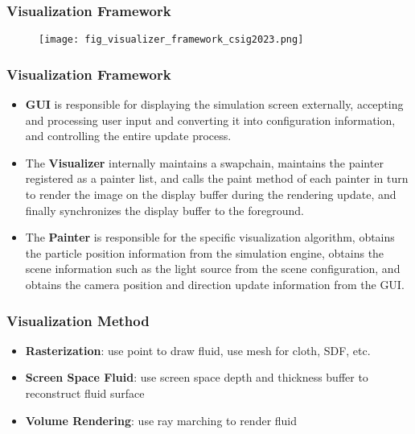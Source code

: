 \begin{frame}
    \frametitle{Visualization Framework}
    \begin{figure}[H]
        \centering
        \texttt{[image: fig\_visualizer\_framework\_csig2023.png]}
    \end{figure}
\end{frame}

\begin{frame}
    \frametitle{Visualization Framework}
    \begin{itemize}
        \item \textbf{GUI} is responsible for displaying the simulation screen externally, accepting and processing user input and converting it into configuration information, and controlling the entire update process.
        \item The \textbf{Visualizer} internally maintains a swapchain, maintains the painter registered as a painter list, and calls the paint method of each painter in turn to render the image on the display buffer during the rendering update, and finally synchronizes the display buffer to the foreground.
        \item The \textbf{Painter} is responsible for the specific visualization algorithm, obtains the particle position information from the simulation engine, obtains the scene information such as the light source from the scene configuration, and obtains the camera position and direction update information from the GUI.
    \end{itemize}
\end{frame}

\begin{frame}
    \frametitle{Visualization Method}
    \begin{itemize}
        \item \textbf{Rasterization}: use point to draw fluid, use mesh for cloth, SDF, etc. 
        \item \textbf{Screen Space Fluid}: use screen space depth and thickness buffer to reconstruct fluid surface
        \item \textbf{Volume Rendering}: use ray marching to render fluid
    \end{itemize}
\end{frame}

